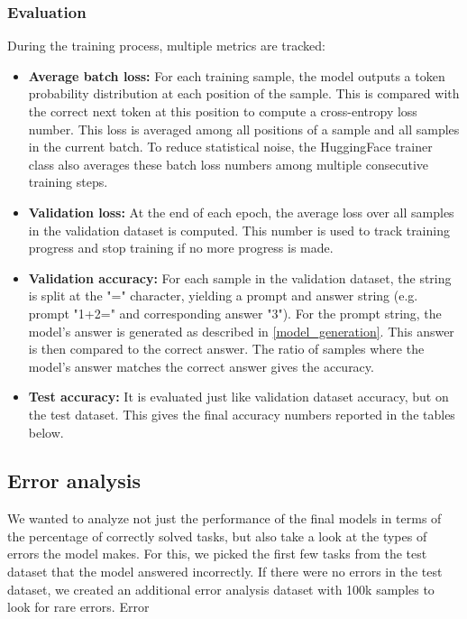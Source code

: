 \subsubsection{Evaluation}

During the training process, multiple metrics are tracked:

\begin{itemize}
	\item \textbf{Average batch loss:}
	For each training sample, the model outputs a token probability distribution at each position of the sample. This is compared with the correct next token at this position to compute a cross-entropy loss number. This loss is averaged among all positions of a sample and all samples in the current batch. To reduce statistical noise, the HuggingFace trainer class also averages these batch loss numbers among multiple consecutive training steps.
	
	\item \textbf{Validation loss:}
	At the end of each epoch, the average loss over all samples in the validation dataset is computed. This number is used to track training progress and stop training if no more progress is made.
	
	\item \textbf{Validation accuracy:}
	For each sample in the validation dataset, the string is split at the "=" character, yielding a prompt and answer string (e.g. prompt "1+2=" and corresponding answer "3"). For the prompt string, the model's answer is generated as described in \cref{model_generation}. This answer is then compared to the correct answer. The ratio of samples where the model's answer matches the correct answer gives the accuracy.
	
	\item \textbf{Test accuracy:}
	It is evaluated just like validation dataset accuracy, but on the test dataset. This gives the final accuracy numbers reported in the tables below.
\end{itemize}


\subsection{Error analysis}
\label{setup:error}

We wanted to analyze not just the performance of the final models in terms of the percentage of correctly solved tasks, but also take a look at the types of errors the model makes.
For this, we picked the first few tasks from the test dataset that the model answered incorrectly. If there were no errors in the test dataset, we created an additional error analysis dataset with 100k samples to look for rare errors.
Error


